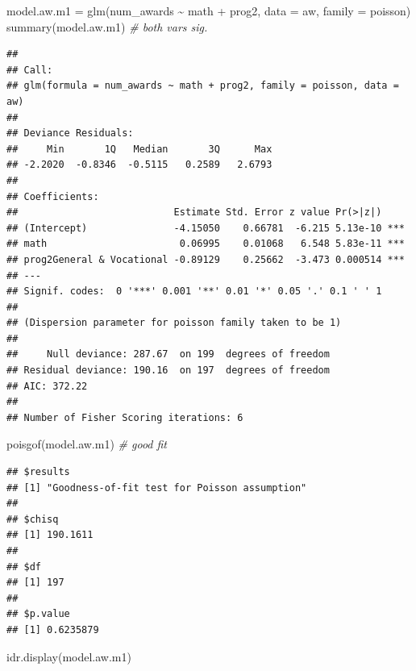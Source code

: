 \documentclass[
]{book}
\makeatletter
\newenvironment{Shaded}{\begin{snugshade}}{\end{snugshade}}
\newcommand{\AttributeTok}[1]{\textcolor[rgb]{0.61,0.61,0.61}{#1}}
\newcommand{\CommentTok}[1]{\textcolor[rgb]{0.37,0.37,0.37}{\textit{#1}}}
\newcommand{\FunctionTok}[1]{\textcolor[rgb]{0,0,0}{#1}}
\newcommand{\NormalTok}[1]{#1}
\newcommand{\OtherTok}[1]{\textcolor[rgb]{0.37,0.37,0.37}{#1}}
\newcommand{\SpecialCharTok}[1]{\textcolor[rgb]{0,0,0}{#1}}
\newenvironment{kframe}{%
\medskip{}
\setlength{\fboxsep}{.8em}
 \def\at@end@of@kframe{}%
 \ifinner\ifhmode%
  \def\at@end@of@kframe{\end{minipage}}%
  \begin{minipage}{\columnwidth}%
 \fi\fi%
 \def\FrameCommand##1{\hskip\@totalleftmargin \hskip-\fboxsep
 \colorbox{shadecolor}{##1}\hskip-\fboxsep
     \hskip-\linewidth \hskip-\@totalleftmargin \hskip\columnwidth}%
 \MakeFramed {\advance\hsize-\width
   \@totalleftmargin\z@ \linewidth\hsize
   \@setminipage}}%
 {\par\unskip\endMakeFramed%
 \at@end@of@kframe}
\renewenvironment{Shaded}{\begin{kframe}}{\end{kframe}}
\makeatother
\begin{document}
\begin{Shaded}
\begin{Highlighting}[]
\NormalTok{model.aw.m1 }\OtherTok{=} \FunctionTok{glm}\NormalTok{(num\_awards }\SpecialCharTok{\textasciitilde{}}\NormalTok{ math }\SpecialCharTok{+}\NormalTok{ prog2, }\AttributeTok{data =}\NormalTok{ aw, }\AttributeTok{family =}\NormalTok{ poisson)}
\FunctionTok{summary}\NormalTok{(model.aw.m1)  }\CommentTok{\# both vars sig.}
\end{Highlighting}
\end{Shaded}

\begin{verbatim}
## 
## Call:
## glm(formula = num_awards ~ math + prog2, family = poisson, data = aw)
## 
## Deviance Residuals: 
##     Min       1Q   Median       3Q      Max  
## -2.2020  -0.8346  -0.5115   0.2589   2.6793  
## 
## Coefficients:
##                           Estimate Std. Error z value Pr(>|z|)    
## (Intercept)               -4.15050    0.66781  -6.215 5.13e-10 ***
## math                       0.06995    0.01068   6.548 5.83e-11 ***
## prog2General & Vocational -0.89129    0.25662  -3.473 0.000514 ***
## ---
## Signif. codes:  0 '***' 0.001 '**' 0.01 '*' 0.05 '.' 0.1 ' ' 1
## 
## (Dispersion parameter for poisson family taken to be 1)
## 
##     Null deviance: 287.67  on 199  degrees of freedom
## Residual deviance: 190.16  on 197  degrees of freedom
## AIC: 372.22
## 
## Number of Fisher Scoring iterations: 6
\end{verbatim}

\begin{Shaded}
\begin{Highlighting}[]
\FunctionTok{poisgof}\NormalTok{(model.aw.m1)  }\CommentTok{\# good fit}
\end{Highlighting}
\end{Shaded}

\begin{verbatim}
## $results
## [1] "Goodness-of-fit test for Poisson assumption"
## 
## $chisq
## [1] 190.1611
## 
## $df
## [1] 197
## 
## $p.value
## [1] 0.6235879
\end{verbatim}

\begin{Shaded}
\begin{Highlighting}[]
\FunctionTok{idr.display}\NormalTok{(model.aw.m1)  }
\end{Highlighting}
\end{Shaded}
\end{document}
